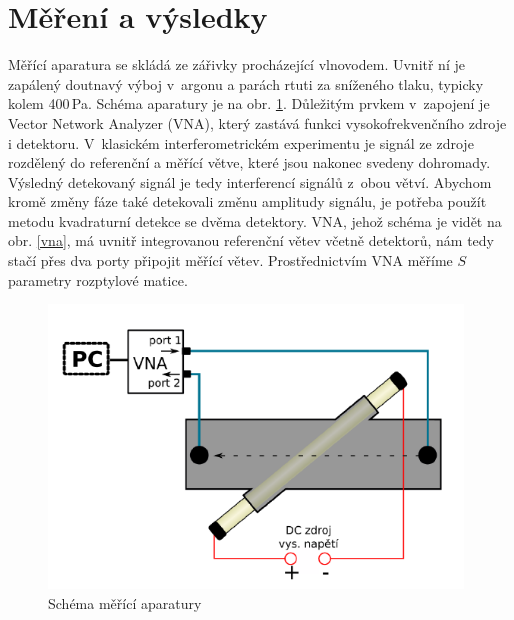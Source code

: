 \documentclass[a4paper,12pt]{article}
\begin{document}

\section{Měření a výsledky}
Měřící aparatura se skládá ze zářivky procházející vlnovodem. Uvnitř ní je
zapálený doutnavý výboj v~argonu a parách rtuti 
za sníženého tlaku, typicky kolem 400\,\si{\pascal}. Schéma aparatury je na obr.
\ref{schema}. Důležitým prvkem v~zapojení je Vector Network Analyzer (VNA),
který zastává funkci vysokofrekvenčního zdroje i detektoru.
V~klasickém interferometrickém experimentu je signál ze zdroje rozdělený do
referenční a měřící větve, které jsou nakonec svedeny dohromady. Výsledný 
detekovaný signál je tedy interferencí signálů z~obou větví. Abychom kromě 
změny fáze také detekovali změnu amplitudy signálu, je potřeba použít metodu 
kvadraturní detekce se dvěma detektory. VNA, jehož schéma je vidět na 
obr. \ref{vna}, má uvnitř integrovanou referenční větev včetně detektorů, 
nám tedy stačí přes dva porty připojit měřící větev. Prostřednictvím VNA měříme $S$ parametry rozptylové matice.

\begin{figure}[h]
	\centering
	\includegraphics[width=110mm]{schema.png}
	\caption{Schéma měřící aparatury}
	\label{schema}
\end{figure}
\end{document}
